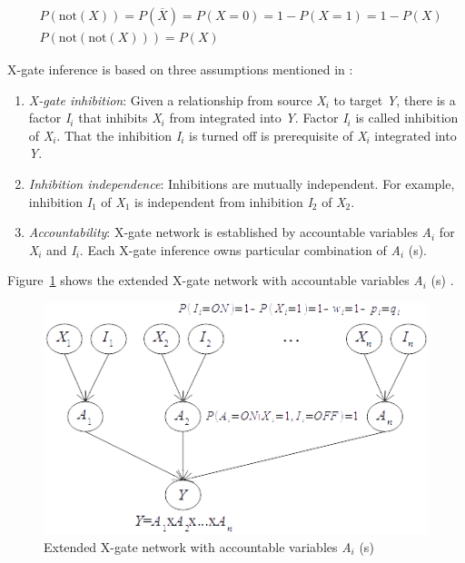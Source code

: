 \documentclass{article}
\numberwithin{equation}{section}
\numberwithin{figure}{section}
\numberwithin{table}{section}
\begin{document}
\begin{equation}
\begin{split} 
&P\left(\mathrm{not}\left(X\right)\right)=P\left(\overline{X}\right)=P\left(X=0\right)=1-P\left(X=1\right)=1-P\left(X\right)\\
&P\left(\mathrm{not}\left(\mathrm{not}\left(X\right)\right)\right)=P\left(X\right)
\end{split}
\label{formula:not-gate-inference}
\end{equation}

X-gate inference is based on three assumptions mentioned in \cite[p.~157]{neapolitan:bn}:

\begin{enumerate}
\item  \textit{X-gate inhibition}: Given a relationship from source \textit{X${}_{i}$} to target \textit{Y}, there is a factor \textit{I${}_{i}$} that inhibits \textit{X${}_{i}$} from integrated into \textit{Y}. Factor \textit{I${}_{i}$} is called inhibition of \textit{X${}_{i}$}. That the inhibition \textit{I${}_{i}$} is turned off is prerequisite of \textit{X${}_{i}$} integrated into \textit{Y}.

\item  \textit{Inhibition independence}: Inhibitions are mutually independent. For example, inhibition \textit{I}${}_{1}$ of \textit{X}${}_{1}$ is independent from inhibition \textit{I}${}_{2}$ of \textit{X}${}_{2}$.

\item  \textit{Accountability}: X-gate network is established by accountable variables \textit{A${}_{i}$} for \textit{X${}_{i}$} and \textit{I${}_{i}$}. Each X-gate inference owns particular combination of \textit{A${}_{i}$} (s).
\end{enumerate}

Figure~\ref{figure:extended-x-gate-network} shows the extended X-gate network with accountable variables \textit{A${}_{i}$} (s) \cite[p.~158]{neapolitan:bn}.

\begin{figure}
\centering
\includegraphics{ExtendedXgateNetwork.png}
\caption{Extended X-gate network with accountable variables \textit{A${}_{i}$} (s)}
\label{figure:extended-x-gate-network}
\end{figure}
\end{document}
